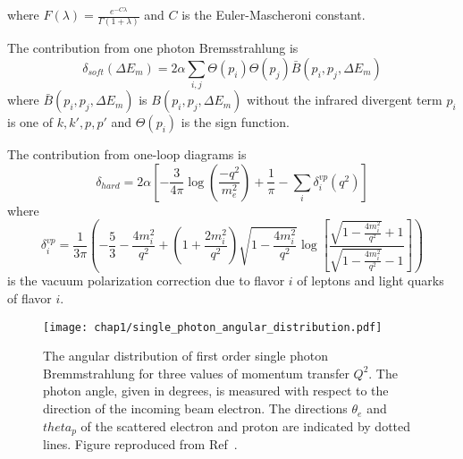 where $F(\lambda)=\frac{e^{-C\lambda}}{\Gamma(1+\lambda)}$ and $C$ is the
Euler-Mascheroni constant.


The contribution from one photon Bremsstrahlung is
\begin{equation}
    \delta_{soft}(\Delta E_m) = 2\alpha \sum_{i,j} \Theta(p_i) \Theta(p_j)
                                                   \bar{B}(p_i,p_j,\Delta E_m)
\end{equation}
where $\bar{B}(p_i,p_j,\Delta E_m)$ is $B(p_i,p_j,\Delta E_m)$ without the
infrared divergent term
$p_i$ is one of $k,k',p,p'$
and
$\Theta(p_i)$ is the sign function.

The contribution from one-loop diagrams is
\begin{equation}
    \delta_{hard} = 2\alpha
                    \left[
                        -\frac{3}{4\pi}\log\left(\frac{-q^2}{m_e^2}\right)
                        + \frac{1}{\pi}
                        - \sum_i \delta^{vp}_i(q^2)
                    \right]
\end{equation}
where
\begin{equation}
    \delta^{vp}_i = \frac{1}{3 \pi}
                        \left(
                            -\frac{5}{3} - \frac{4 m_{i}^{2}}{q^{2}} +
                            \left(1+\frac{2 m_{i}^{2}}{q^{2}}\right)
                            \sqrt{1-\frac{4 m_{i}^{2}}{q^{2}}}
                            \log \left[\frac{\sqrt{1-\frac{4 m_{i}^{2}}{q^{2}}}+1}
                                            {\sqrt{1-\frac{4 m_{i}^{2}}{q^{2}}}-1}
                                 \right]
                        \right)
\end{equation}
is the vacuum polarization correction due to flavor $i$ of leptons and light quarks of flavor $i$.

\begin{figure}[!h]
    \centering
    \texttt{[image: chap1/single\_photon\_angular\_distribution.pdf]}
    \caption[The angular distribution of first order single photon
             Bremmstrahlung for three values of momentum transfer $Q^2$.]{The angular distribution of first order single photon
             Bremmstrahlung for three values of momentum transfer $Q^2$.
             The photon angle, given in degrees, is measured with respect to
             the direction of the incoming beam electron.
             The directions $\theta_e$ and $theta_p$ of the scattered electron
             and proton are indicated by dotted lines.
             Figure reproduced from Ref~\cite{Ent_2001}.
             }
    \label{fig:single_photon_angular_distribution}
\end{figure}

